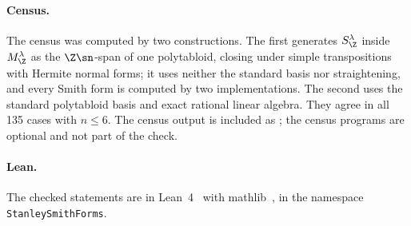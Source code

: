 \paragraph{Census.} The census was computed by two constructions. The first
generates $S^\lambda_\Z$ inside $M^\lambda_\Z$ as the $\Z\sn$-span of one
polytabloid, closing under simple transpositions with Hermite normal forms;
it uses neither the standard basis nor straightening, and every Smith form
is computed by two implementations. The second uses the standard polytabloid
basis and exact rational linear algebra. They agree in all 135 cases with
$n\le6$. The census output is included as ; the
census programs are optional and not part of the check.

\paragraph{Lean.}\sloppy The checked statements are in Lean~4~\cite{lean} with
mathlib~\cite{mathlib}, in the namespace \texttt{StanleySmithForms}.
